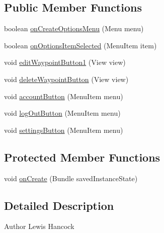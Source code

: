 \subsection*{Public Member Functions}
\begin{DoxyCompactItemize}
\item 
boolean \hyperlink{classuk_1_1ac_1_1swan_1_1digitaltrails_1_1activities_1_1_waypoint_list_activity_afce9a7d7e1b94156aff26ac41e1c8a3d}{on\+Create\+Options\+Menu} (Menu menu)
\item 
boolean \hyperlink{classuk_1_1ac_1_1swan_1_1digitaltrails_1_1activities_1_1_waypoint_list_activity_ae01f14883f7cd822591138db1173d7c7}{on\+Options\+Item\+Selected} (Menu\+Item item)
\item 
void \hyperlink{classuk_1_1ac_1_1swan_1_1digitaltrails_1_1activities_1_1_waypoint_list_activity_aefde40ca42f80de70bd289059ba0ed49}{edit\+Waypoint\+Button1} (View view)
\item 
void \hyperlink{classuk_1_1ac_1_1swan_1_1digitaltrails_1_1activities_1_1_waypoint_list_activity_afdaa5dc77ef1d6acae4c4296e08ce091}{delete\+Waypoint\+Button} (View view)
\item 
void \hyperlink{classuk_1_1ac_1_1swan_1_1digitaltrails_1_1activities_1_1_waypoint_list_activity_a3bead1ca441cc41ca81caba6705d4e56}{account\+Button} (Menu\+Item menu)
\item 
void \hyperlink{classuk_1_1ac_1_1swan_1_1digitaltrails_1_1activities_1_1_waypoint_list_activity_adaa8a6df0e5a3d1af70f163febf49f11}{log\+Out\+Button} (Menu\+Item menu)
\item 
void \hyperlink{classuk_1_1ac_1_1swan_1_1digitaltrails_1_1activities_1_1_waypoint_list_activity_af8bdcc7bdc0912ee074dbbbf94fb505b}{settings\+Button} (Menu\+Item menu)
\end{DoxyCompactItemize}
\subsection*{Protected Member Functions}
\begin{DoxyCompactItemize}
\item 
void \hyperlink{classuk_1_1ac_1_1swan_1_1digitaltrails_1_1activities_1_1_waypoint_list_activity_ab2f6016489b119bd42a0b9bc1d7660ac}{on\+Create} (Bundle saved\+Instance\+State)
\end{DoxyCompactItemize}


\subsection{Detailed Description}
\begin{DoxyAuthor}{Author}
Lewis Hancock 
\end{DoxyAuthor}


